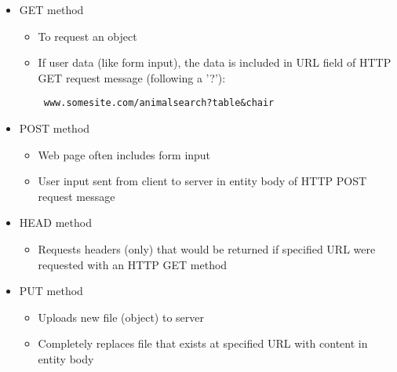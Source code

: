 \begin{itemize}
    \begin{itemize}

      \item GET method

        \begin{itemize}

          \item To request an object

          \item If user data (like form input), the data is included in URL field of HTTP GET request message (following a '?'):

            \begin{center}
              \texttt{ www.somesite.com/animalsearch?table\&chair}
            \end{center}

        \end{itemize}

      \item POST method

        \begin{itemize}

          \item Web page often includes form input

          \item User input sent from client to server in entity body of HTTP POST request message

        \end{itemize}

      \item HEAD method

        \begin{itemize}

          \item Requests headers (only) that would be returned if specified URL were requested  with an HTTP GET method

        \end{itemize}

      \item PUT method

        \begin{itemize}

          \item Uploads new file (object) to server

          \item Completely replaces file that exists at specified URL with content in entity body


\end{itemize}
\end{itemize}
\end{itemize}
